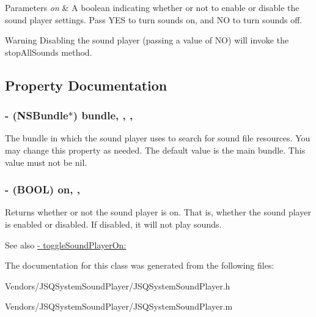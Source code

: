 \begin{DoxyParams}{Parameters}
{\em on} & A boolean indicating whether or not to enable or disable the sound player settings. Pass {\ttfamily Y\+E\+S} to turn sounds on, and {\ttfamily N\+O} to turn sounds off.\\
\hline
\end{DoxyParams}
\begin{DoxyWarning}{Warning}
Disabling the sound player (passing a value of {\ttfamily N\+O}) will invoke the {\ttfamily stop\+All\+Sounds} method. 
\end{DoxyWarning}


\subsection{Property Documentation}
\hypertarget{interface_j_s_q_system_sound_player_a7ffd82c67a99e926282624b897e1fa1d}{}
\subsubsection[{bundle}]{\setlength{\rightskip}{0pt plus 5cm}-\/ (N\+S\+Bundle$\ast$) bundle\hspace{0.3cm}{\ttfamily [read]}, {\ttfamily [write]}, {\ttfamily [nonatomic]}, {\ttfamily [strong]}}\label{interface_j_s_q_system_sound_player_a7ffd82c67a99e926282624b897e1fa1d}
The bundle in which the sound player uses to search for sound file resources. You may change this property as needed. The default value is the main bundle. This value must not be {\ttfamily nil}. \hypertarget{interface_j_s_q_system_sound_player_acfbac062deb875d2818c5565c80602ad}{}
\subsubsection[{on}]{\setlength{\rightskip}{0pt plus 5cm}-\/ (B\+O\+O\+L) on\hspace{0.3cm}{\ttfamily [read]}, {\ttfamily [nonatomic]}, {\ttfamily [assign]}}\label{interface_j_s_q_system_sound_player_acfbac062deb875d2818c5565c80602ad}
Returns whether or not the sound player is on. That is, whether the sound player is enabled or disabled. If disabled, it will not play sounds.

\begin{DoxySeeAlso}{See also}
{\ttfamily \hyperlink{interface_j_s_q_system_sound_player_afb71d72c35b2b9b26974947ab3d5ee70}{-\/ toggle\+Sound\+Player\+On\+:}} 
\end{DoxySeeAlso}


The documentation for this class was generated from the following files\+:\begin{DoxyCompactItemize}
\item 
Vendors/\+J\+S\+Q\+System\+Sound\+Player/J\+S\+Q\+System\+Sound\+Player.\+h\item 
Vendors/\+J\+S\+Q\+System\+Sound\+Player/J\+S\+Q\+System\+Sound\+Player.\+m\end{DoxyCompactItemize}
